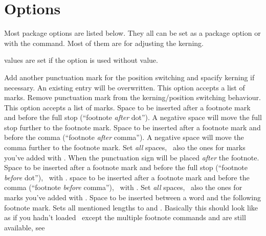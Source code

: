 \documentclass[load-preamble+]{cnltx-doc}
\begin{document}
\section{Options}\label{sec:options}
Most package options are listed below.  They all can be set as a package
option or with the  command.  Most of them are for adjusting the
kerning.

 values are set if the option is used without value.
\begin{options}
    Add another punctuation mark for the position switching and spacify
    kerning if necessary.  An existing entry will be overwritten.  This option
    accepts a list of marks.
    Remove punctuation mark from the kerning/position switching behaviour.
    This option accepts a list of marks.
  \Default{-.06em}
    Space to be inserted after a footnote mark and before the full stop
    (``footnote \emph{after} dot'').  A negative space will move the full stop
    further to the footnote mark.
  \Default{-.06em}
    Space to be inserted after a footnote mark and before the comma
    (``footnote \emph{after} comma'').  A negative space will move the comma
    further to the footnote mark.
    Set \emph{all} spaces, \ie\ also the ones for marks you've added with
    .
    When  the punctuation sign will be placed \emph{after} the
    footnote.
  \Default{-.16em}
    Space to be inserted after a footnote mark and before the full stop
    (``footnote \emph{before} dot''), \ie\ with .
  \Default{-.16em}
    space to be inserted after a footnote mark and before the comma
    (``footnote \emph{before} comma''), \ie\ with .
    Set \emph{all} spaces, \ie\ also the ones for marks you've added with
    .
  \Default{.06em}
    Space to be inserted between a word and the following footnote mark.
    Sets all mentioned lengths to \code{0pt} and .
    Basically this should look like as if you hadn't loaded \fnpct\ except the
    multiple footnote commands and  are still available, see

\end{options}
\end{document}
